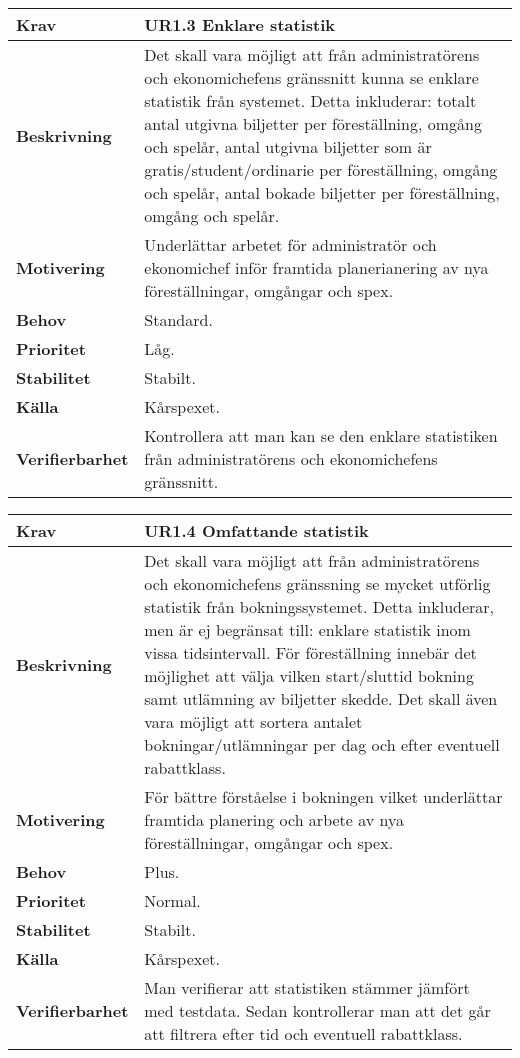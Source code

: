 \documentclass[a4paper, twoside, 11pt, titlepage]{article}
\begin{document}
		\begin{tabular} { p{2.6cm} p{12.5cm} }
			\hline
			\sffamily\textbf{Krav} & \sffamily\textbf{UR1.3 Enklare statistik  } \\
			\hline
			\sffamily\textbf{Beskrivning} & Det skall vara möjligt att från administratörens och ekonomichefens gränssnitt kunna se enklare statistik från systemet. Detta inkluderar: totalt antal utgivna biljetter per föreställning, omgång och spelår, antal utgivna biljetter som är gratis/student/ordinarie per föreställning, omgång och spelår, antal bokade biljetter per föreställning, omgång och spelår.  \\
			\hline
			\sffamily\textbf{Motivering} & Underlättar arbetet för administratör och ekonomichef inför framtida planerianering av nya föreställningar, omgångar och spex.  \\
			\hline
			\sffamily\textbf{Behov} & Standard.  \\
			\hline
			\sffamily\textbf{Prioritet} & Låg.  \\
			\hline
			\sffamily\textbf{Stabilitet} & Stabilt.  \\
			\hline
			\sffamily\textbf{Källa} & Kårspexet.  \\
			\hline
			\sffamily\textbf{Verifierbarhet} & Kontrollera att man kan se den enklare statistiken från administratörens och ekonomichefens gränssnitt.  \\
			\hline
		\end{tabular}
		\vspace{6mm}

		\begin{tabular} { p{2.6cm} p{12.5cm} }
			\hline
			\sffamily\textbf{Krav} & \sffamily\textbf{UR1.4 Omfattande statistik  } \\
			\hline
			\sffamily\textbf{Beskrivning} & Det skall vara möjligt att från administratörens och ekonomichefens gränssning se mycket utförlig statistik från bokningssystemet. Detta inkluderar, men är ej begränsat till: enklare statistik inom vissa tidsintervall. För föreställning innebär det möjlighet att välja vilken start/sluttid bokning samt utlämning av biljetter skedde. Det skall även vara möjligt att sortera antalet bokningar/utlämningar per dag och efter eventuell rabattklass.  \\
			\hline
			\sffamily\textbf{Motivering} & För bättre förståelse i bokningen vilket underlättar framtida planering och arbete av nya föreställningar, omgångar och spex.  \\
			\hline
			\sffamily\textbf{Behov} & Plus.  \\
			\hline
			\sffamily\textbf{Prioritet} & Normal.  \\
			\hline
			\sffamily\textbf{Stabilitet} & Stabilt.  \\
			\hline
			\sffamily\textbf{Källa} & Kårspexet.  \\
			\hline
			\sffamily\textbf{Verifierbarhet} & Man verifierar att statistiken stämmer jämfört med testdata. Sedan kontrollerar man att det går att filtrera efter tid och eventuell rabattklass.  \\
			\hline
		\end{tabular}
		\vspace{6mm}
\end{document}
